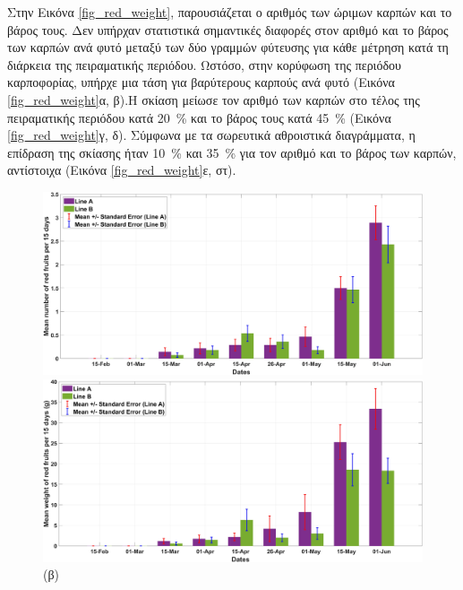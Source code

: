 \documentclass[12pt, a4paper]{report} %
\begin{document}
Στην Εικόνα \ref{fig_red_weight}, παρουσιάζεται ο αριθμός των ώριμων καρπών και το βάρος τους. Δεν υπήρχαν στατιστικά 
σημαντικές διαφορές στον αριθμό και το βάρος των καρπών ανά φυτό μεταξύ των δύο γραμμών φύτευσης για κάθε μέτρηση κατά 
τη διάρκεια της πειραματικής περιόδου. Ωστόσο, στην κορύφωση της περιόδου καρποφορίας, υπήρχε μια τάση για βαρύτερους 
καρπούς ανά φυτό (Εικόνα \ref{fig_red_weight}α, β).Η σκίαση μείωσε τον αριθμό των καρπών στο τέλος της πειραματικής 
περιόδου κατά \SI{20}{\percent} και το βάρος τους κατά \SI{45}{\percent} (Εικόνα \ref{fig_red_weight}γ, δ). Σύμφωνα με 
τα σωρευτικά αθροιστικά διαγράμματα, η επίδραση της σκίασης ήταν \SI{10}{\percent} και \SI{35}{\percent} για τον αριθμό 
και το βάρος των καρπών, αντίστοιχα (Εικόνα \ref{fig_red_weight}ε, στ).

\begin{figure}[H]
    \begin{adjustwidth}{-0.5cm}{0cm}
        \begin{minipage}{0.5\textwidth}
            \centering
            \includegraphics[scale=0.05]{red_weight_a.jpg}
            \caption*{\hspace{35pt}(α)}{}
        \end{minipage}
        \hfill
        \begin{minipage}[c]{0.5\textwidth}
            \centering
            \includegraphics[scale=0.05]{red_weight_b.jpg}
            \caption*{\hspace{35pt}(β)}{}
        \end{minipage}


\end{adjustwidth}
\end{figure}
\end{document}
